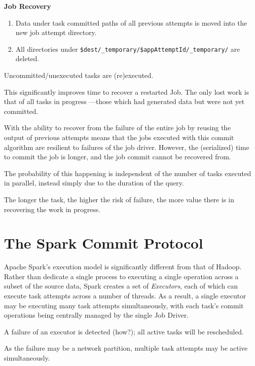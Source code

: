 \documentclass[conference]{IEEEtran}
\begin{document}
\textbf{Job Recovery}

\begin{enumerate}

\item Data under task committed paths of all previous attempts is moved
into the new job attempt directory.
\item All directories under \texttt{\$dest/\_temporary/\$appAttemptId/\_temporary/}
are deleted.
\end{enumerate}

Uncommitted/unexecuted tasks are (re)executed.

This significantly improves time to recover a restarted Job.
The only lost work is that of all tasks in progress ---those which had generated
data but were not yet committed.


With the ability to recover from the failure of the entire job by
reusing the output of previous attempts means that the jobs executed
with this commit algorithm are resilient to failures of the job driver.
However, the (serialized) time to commit the job is longer, and the job
commit cannot be recovered from.


The probability of this happening is independent of the number
of tasks executed in parallel, instead simply due to the duration of the query.

The longer the task, the higher the risk of failure, the more value there is
in recovering the work in progress.




\section{The Spark Commit Protocol}
\label{sec:theSparkCommitProtocol}

Apache Spark's execution model is significantly different from
that of Hadoop.
Rather than dedicate a single process to executing a single operation
across a subset of the source data, Spark creates a set of \emph{Executors},
each of which can execute task attempts across a number of threads.
As a result, a single executor may be executing many task attempts
simultaneously, with each task's commit operations being centrally managed
by the single Job Driver.


A failure of an executor is detected (how?);
all active tasks will be rescheduled.

As the failure may be a network partition, multiple task attempts may be active
simultaneously.
\end{document}
